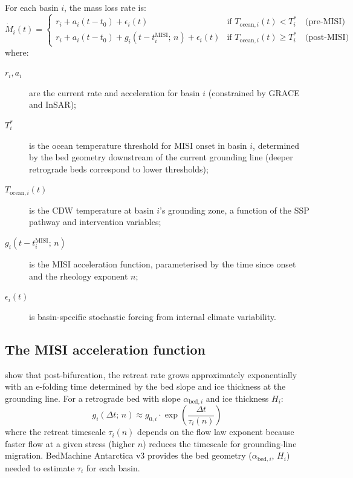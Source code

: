 \documentclass[11pt]{article}
\newcommand{\MISI}{\text{MISI}}
\begin{document}
For each basin $i$, the mass loss rate is:
\begin{equation}
  \dot{M}_i(t) =
  \begin{cases}
    r_i + a_i(t - t_0) + \epsilon_i(t)
      & \text{if } T_{\text{ocean},i}(t) < T^*_i \quad\text{(pre-MISI)} \\[6pt]
    r_i + a_i(t - t_0) + g_i\!\left(t - t^{\MISI}_i;\, n\right) + \epsilon_i(t)
      & \text{if } T_{\text{ocean},i}(t) \geq T^*_i \quad\text{(post-MISI)}
  \end{cases}
  \label{eq:basin_dynamics}
\end{equation}
where:
\begin{description}
  \item[$r_i, a_i$] are the current rate and acceleration for basin $i$ (constrained by GRACE and InSAR);

  \item[$T^*_i$] is the ocean temperature threshold for MISI onset in basin $i$, determined by the bed geometry downstream of the current grounding line (deeper retrograde beds correspond to lower thresholds);

  \item[$T_{\text{ocean},i}(t)$] is the CDW temperature at basin $i$'s grounding zone, a function of the SSP pathway and intervention variables;

  \item[$g_i(t - t^{\MISI}_i;\, n)$] is the MISI acceleration function, parameterised by the time since onset and the rheology exponent $n$;

  \item[$\epsilon_i(t)$] is basin-specific stochastic forcing from internal climate variability.
\end{description}

\subsection{The MISI acceleration function}

\citet{robel2019marine} show that post-bifurcation, the retreat rate grows approximately exponentially with an e-folding time determined by the bed slope and ice thickness at the grounding line.  For a retrograde bed with slope $\alpha_{\text{bed},i}$ and ice thickness $H_i$:
\begin{equation}
  g_i(\Delta t;\, n) \approx g_{0,i} \cdot \exp\!\left(\frac{\Delta t}{\tau_i(n)}\right)
  \label{eq:misi_acceleration}
\end{equation}
where the retreat timescale $\tau_i(n)$ depends on the flow law exponent because faster flow at a given stress (higher $n$) reduces the timescale for grounding-line migration.  BedMachine Antarctica v3 provides the bed geometry ($\alpha_{\text{bed},i}$, $H_i$) needed to estimate $\tau_i$ for each basin.
\end{document}
